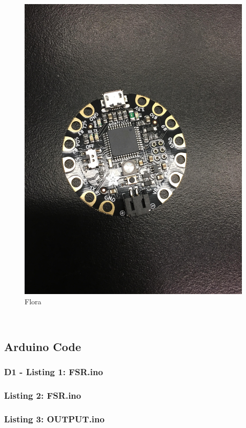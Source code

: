 \documentclass[11.5pt]{article}
\begin{document}
\begin{figure}[H]
    \centering
    \includegraphics[width=0.5\linewidth]{Appendix/LP.jpg}
    \caption{Flora}
    \label{fig:LP}
\end{figure}
\vspace{0.5mm}\\

\newpage


\subsection{ Arduino Code} \label{D}
\subsubsection{D1 - Listing 1: FSR.ino}\label{D1}


\pagebreak

\subsubsection{Listing 2: FSR.ino} \label{D2}


\pagebreak

\subsubsection{Listing 3: OUTPUT.ino} \label{D3}

\end{document}
